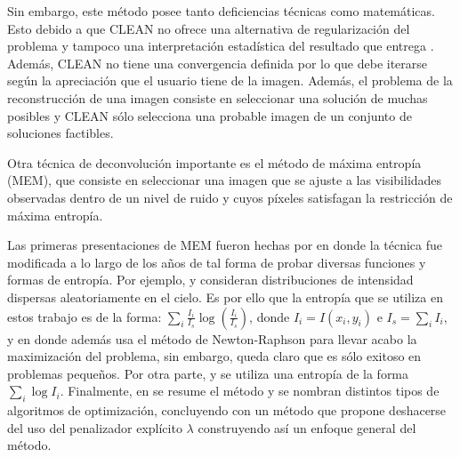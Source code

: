 Sin embargo, este método posee tanto deficiencias técnicas como matemáticas. Esto debido a que CLEAN no ofrece una alternativa de regularización del problema y tampoco una interpretación estadística del resultado que entrega \citep{libroAstro2}. Además, CLEAN no tiene una convergencia definida por lo que debe iterarse según la apreciación que el usuario tiene de la imagen. Además, el problema de la reconstrucción de una imagen consiste en seleccionar una solución de muchas posibles y CLEAN sólo selecciona una probable imagen de un conjunto de soluciones factibles.

Otra técnica de deconvolución importante es el método de máxima entropía (MEM), que consiste en seleccionar una imagen que se ajuste a las visibilidades observadas dentro de un nivel de ruido y cuyos píxeles satisfagan la restricción de máxima entropía.

Las primeras presentaciones de MEM fueron hechas por \citep{FRIEDEN:72, mem2, daddario, themaxen, skilling1984} en donde la técnica fue modificada a lo largo de los años de tal forma de probar diversas funciones y formas de entropía. Por ejemplo, \citep{FRIEDEN:72} y \citep{themaxen} consideran distribuciones de intensidad dispersas aleatoriamente en el cielo. Es por ello que la entropía que se utiliza en estos trabajo es de la forma: $\sum_{i}\frac{I_{i}}{I_{s}}\log(\frac{I_{i}}{I_{s}})$, donde $I_{i}=I(x_{i}, y_{i})$ e $I_{s}=\sum_{i}I_{i}$, y en donde además \citep{FRIEDEN:72} usa el método de Newton-Raphson para llevar acabo la maximización del problema, sin embargo, queda claro que es sólo exitoso en problemas pequeños. Por otra parte, \citep{mem2} y \citep{daddario} se utiliza una entropía de la forma $\sum_{i}\log I_{i}$. Finalmente, en \citep{skilling1984} se resume el método y se nombran distintos tipos de algoritmos de optimización, concluyendo con un método que propone deshacerse del uso del penalizador explícito $\lambda$ construyendo así un enfoque general del método.








